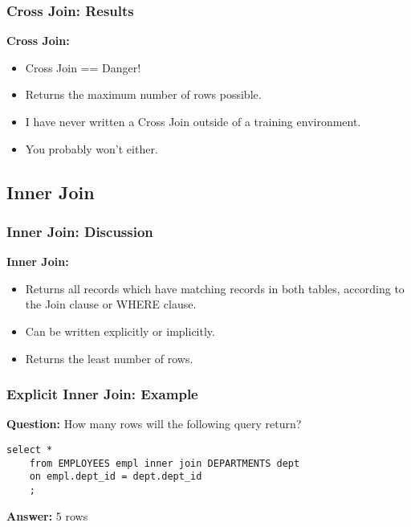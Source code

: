 \documentclass{beamer}
\begin{document}
\begin{frame} %
  \frametitle{Cross Join: Results}
  \textbf{Cross Join:}
  
  \bigskip
  \begin{itemize}
  \item Cross Join == Danger!
  \item Returns the maximum number of rows possible.
  \item I have never written a Cross Join outside of a training environment.
  \item You probably won't either.
  \end{itemize}
\end{frame}

\subsection{Inner Join} %

\begin{frame}[containsverbatim] %
  \frametitle{Inner Join: Discussion}

  \textbf{Inner Join:}

  \bigskip
  \begin{itemize}
  \item Returns all records which have matching records in both
    tables, according to the Join clause or WHERE clause.
  \item Can be written explicitly or implicitly.
  \item Returns the least number of rows.
  \end{itemize}
\end{frame}

\begin{frame}[fragile] %
  \frametitle{Explicit Inner Join: Example}

  \textbf{Question:} How many rows will the following query return?
  \bigskip

  \begin{lstlisting}[title={\tiny Source: https://github.com/Choens/sql-survival-guide/blob/master/sql/04-joins/cross-join.sql}]
    select *
    from EMPLOYEES empl inner join DEPARTMENTS dept
    on empl.dept_id = dept.dept_id
    ;
  \end{lstlisting}

  \bigskip
  \pause
  \textbf{Answer:} 5 rows

\end{frame}
\end{document}
